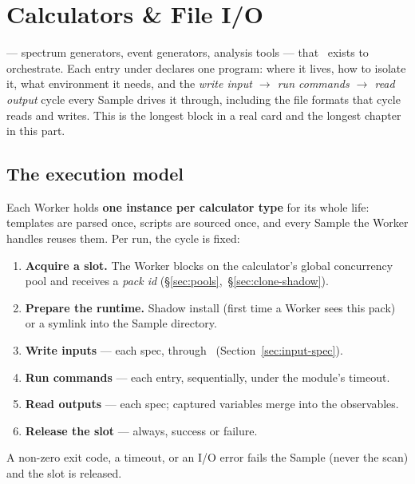 \chapter{Calculators \& File I/O}
\label{ch:calculators}

 --- spectrum generators, event
generators, analysis tools --- that \Jtwo\ exists to orchestrate. Each entry under
 declares one program: where it lives, how to isolate it,
what environment it needs, and the \emph{write input $\rightarrow$ run commands
$\rightarrow$ read output} cycle every Sample drives it through, including the file
formats that cycle reads and writes. This is the longest block in a real card and the
longest chapter in this part.

\section{The execution model}
\label{sec:calc-model}

Each Worker holds \textbf{one instance per calculator type} for its whole life:
templates are parsed once,  scripts are sourced once, and every
Sample the Worker handles reuses them. Per run, the cycle is fixed:

\begin{enumerate}
  \item \textbf{Acquire a slot.} The Worker blocks on the calculator's global
        concurrency pool and receives a \emph{pack id}
        (\S\ref{sec:pools},~\S\ref{sec:clone-shadow}).
  \item \textbf{Prepare the runtime.} Shadow install (first time a Worker sees this
        pack) or a symlink into the Sample directory.
  \item \textbf{Write inputs} --- each  spec, through \Portal\
        (Section~\ref{sec:input-spec}).
  \item \textbf{Run commands} --- each  entry, sequentially,
        under the module's timeout.
  \item \textbf{Read outputs} --- each  spec; captured
        variables merge into the observables.
  \item \textbf{Release the slot} --- always, success or failure.
\end{enumerate}

A non-zero exit code, a timeout, or an I/O error fails the Sample (never the scan) and
the slot is released.

